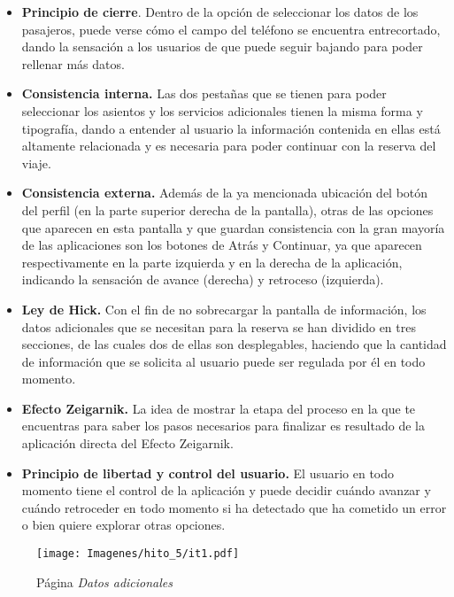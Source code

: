 \begin{itemize}
    \item \textbf{Principio de cierre}. Dentro de la opción de seleccionar los datos de los pasajeros, puede verse
        cómo el campo del teléfono se encuentra entrecortado, dando la sensación a los usuarios de que puede seguir
        bajando para poder rellenar más datos.
    \item \textbf{Consistencia interna.} Las dos pestañas que se tienen para poder seleccionar los asientos y los servicios
        adicionales tienen la misma forma y tipografía, dando a entender al usuario la información contenida en
        ellas está altamente relacionada y es necesaria para poder continuar con la reserva del viaje.
    \item \textbf{Consistencia externa.} Además de la ya mencionada ubicación del botón del perfil (en la parte superior
        derecha de la pantalla), otras de las opciones que aparecen en esta pantalla y que guardan consistencia
        con la gran mayoría de las aplicaciones son los botones de Atrás y Continuar, ya que aparecen respectivamente
        en la parte izquierda y en la derecha de la aplicación, indicando la sensación de avance (derecha) y retroceso
        (izquierda).
    \item \textbf{Ley de Hick.} Con el fin de no sobrecargar la pantalla de información, los datos adicionales que se necesitan
        para la reserva se han dividido en tres secciones, de las cuales dos de ellas son desplegables, haciendo que
        la cantidad de información que se solicita al usuario puede ser regulada por él en todo momento.
    \item \textbf{Efecto Zeigarnik.} La idea de mostrar la etapa del proceso en la que te encuentras para saber los pasos
        necesarios para finalizar es resultado de la aplicación directa del Efecto Zeigarnik.
    \item \textbf{Principio de libertad y control del usuario.} El usuario en todo momento tiene el control de la aplicación
        y puede decidir cuándo avanzar y cuándo retroceder en todo momento si ha detectado que ha cometido un error
        o bien quiere explorar otras opciones.
\end{itemize}

\begin{figure}
    \centering
    \texttt{[image: Imagenes/hito\_5/it1.pdf]}
    \caption{Página \textit{Datos adicionales}}
    \label{fig:it1_datos_adicionales}
\end{figure}

